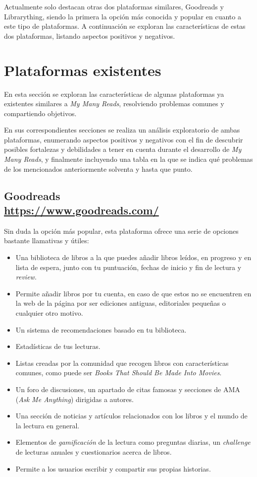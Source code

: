 Actualmente solo destacan otras dos plataformas similares, Goodreads y Librarything, siendo la primera la opción más conocida y popular en cuanto a este tipo de plataformas. A continuación se exploran las características de estas dos plataformas, listando aspectos positivos y negativos.

\section{Plataformas existentes}

En esta sección se exploran las características de algunas plataformas ya existentes similares a \textit{My Many Reads}, resolviendo problemas comunes y compartiendo objetivos.

En sus correspondientes secciones se realiza un análisis exploratorio de ambas plataformas, enumerando aspectos positivos y negativos con el fin de descubrir posibles fortalezas y debilidades a tener en cuenta durante el desarrollo de \textit{My Many Reads}, y finalmente incluyendo una tabla en la que se indica qué problemas de los mencionados anteriormente solventa y hasta que punto.

\subsection[Goodreads]{Goodreads\\ {\large \url{https://www.goodreads.com/}}}

Sin duda la opción más popular, esta plataforma ofrece una serie de opciones bastante llamativas y útiles:

\begin{itemize}
    \item Una biblioteca de libros a la que puedes añadir libros leídos, en progreso y en lista de espera, junto con tu puntuación, fechas de inicio y fin de lectura y \textit{review}.
    \item Permite añadir libros por tu cuenta, en caso de que estos no se encuentren en la web de la página por ser ediciones antiguas, editoriales pequeñas o cualquier otro motivo.
    \item Un sistema de recomendaciones basado en tu biblioteca.
    \item Estadísticas de tus lecturas.
    \item Listas creadas por la comunidad que recogen libros con características comunes, como puede ser \textit{Books That Should Be Made Into Movies}.
    \item Un foro de discusiones, un apartado de citas famosas y secciones de AMA (\textit{Ask Me Anything}) dirigidas a autores.
    \item Una sección de noticias y artículos relacionados con los libros y el mundo de la lectura en general.
    \item Elementos de \textit{gamificación} de la lectura como preguntas diarias, un \textit{challenge} de lecturas anuales y cuestionarios acerca de libros.
    \item Permite a los usuarios escribir y compartir sus propias historias.
\end{itemize}


